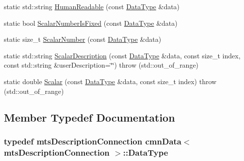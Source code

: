 \begin{DoxyCompactItemize}
\item 
static std\+::string \hyperlink{classcmn_data_3_01mts_description_connection_01_4_a33941d5eb332171110836f8eca39f43b}{Human\+Readable} (const \hyperlink{classcmn_data_3_01mts_description_connection_01_4_ab5515cf136f07ae656b44ade675282a9}{Data\+Type} \&data)
\item 
static bool \hyperlink{classcmn_data_3_01mts_description_connection_01_4_af5f3939c268708bed21144c50eccbfe8}{Scalar\+Number\+Is\+Fixed} (const \hyperlink{classcmn_data_3_01mts_description_connection_01_4_ab5515cf136f07ae656b44ade675282a9}{Data\+Type} \&data)
\item 
static size\+\_\+t \hyperlink{classcmn_data_3_01mts_description_connection_01_4_a2e8e2761a6dff74abc7675eb3fee8c54}{Scalar\+Number} (const \hyperlink{classcmn_data_3_01mts_description_connection_01_4_ab5515cf136f07ae656b44ade675282a9}{Data\+Type} \&data)
\item 
static std\+::string \hyperlink{classcmn_data_3_01mts_description_connection_01_4_a3e9a5fc18c1c27514a9cd3a3731fa07f}{Scalar\+Description} (const \hyperlink{classcmn_data_3_01mts_description_connection_01_4_ab5515cf136f07ae656b44ade675282a9}{Data\+Type} \&data, const size\+\_\+t index, const std\+::string \&user\+Description=\char`\"{}\char`\"{})  throw (std\+::out\+\_\+of\+\_\+range)
\item 
static double \hyperlink{classcmn_data_3_01mts_description_connection_01_4_a0694e8b669097064d4857b402bb2a11b}{Scalar} (const \hyperlink{classcmn_data_3_01mts_description_connection_01_4_ab5515cf136f07ae656b44ade675282a9}{Data\+Type} \&data, const size\+\_\+t index)  throw (std\+::out\+\_\+of\+\_\+range)
\end{DoxyCompactItemize}


\subsection{Member Typedef Documentation}
\hypertarget{classcmn_data_3_01mts_description_connection_01_4_ab5515cf136f07ae656b44ade675282a9}{}
\subsubsection[{Data\+Type}]{\setlength{\rightskip}{0pt plus 5cm}typedef {\bf mts\+Description\+Connection} {\bf cmn\+Data}$<$ {\bf mts\+Description\+Connection} $>$\+::{\bf Data\+Type}}\label{classcmn_data_3_01mts_description_connection_01_4_ab5515cf136f07ae656b44ade675282a9}


